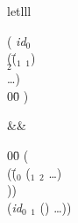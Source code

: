 \begin{optDefinition}
\begin{RewriteTable}{let}{lll}
\begin{minipage}[t]{\columnwidth}
\begin{tabbing}
    ( \={\em id$_0$}\\
    \>(\=($_1$ $_1$) \\
    \>\>$_2$ \\
    \>\>\ldots)\\
    00\= \kill
    \>)
\end{tabbing}
\end{minipage}
&\rewrite&
\begin{minipage}[t]{\columnwidth}
\begin{tabbing}
    00\= \kill
    (\\
    \>(\=($_0$ ($_1$ $_2$ \ldots) \\
    \>\>)) \\
    \>({\em id$_0$} $_1$ () \ldots))
\end{tabbing}%
\end{minipage}%
\end{RewriteTable}


\end{optDefinition}
